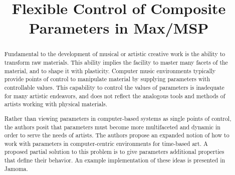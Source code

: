 \documentclass{article}
\title{Flexible Control of Composite Parameters in Max/MSP}
\begin{document}
\maketitle
\sloppy


\begin{abstract}


Fundamental to the development of musical or artistic creative work is the ability to transform raw materials. This ability implies the facility to master many facets of the material, and to shape it with plasticity. Computer music environments typically provide points of control to manipulate material by supplying parameters with controllable values. This capability to control the values of parameters is inadequate for many artistic endeavors, and does not reflect the analogous tools and methods of artists working with physical materials.

Rather than viewing parameters in computer-based systems as single points of control, the authors posit that parameters must become more multifaceted and dynamic in order to serve the needs of artists. The authors propose an expanded notion of how to work with parameters in computer-centric environments for time-based art. A proposed partial solution to this problem is to give parameters additional properties that define their behavior. An example implementation of these ideas is presented in Jamoma. 

\end{abstract}

\end{document}
